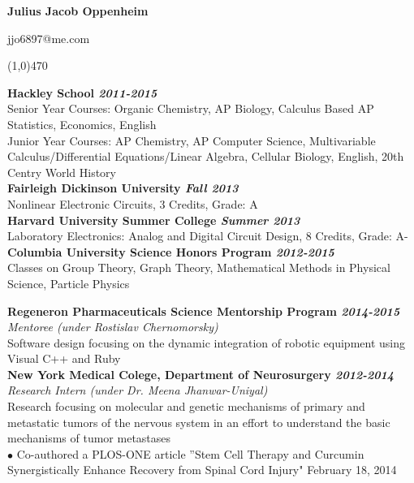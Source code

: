 \documentclass[10pt]{article}
\begin{document}
  
\centerline{\LARGE \bf Julius Jacob Oppenheim}
\centerline{jjo6897@me.com}
\noindent
\line(1,0){470}\\

\begin{adjustwidth}{2.5em}{0pt}
{\bf Hackley School \hfill \sl 2011-2015} \\
Senior Year Courses: Organic Chemistry, AP Biology, Calculus Based AP Statistics, Economics, English \\
Junior Year Courses: AP Chemistry, AP Computer Science, Multivariable Calculus/Differential Equations/Linear Algebra, Cellular Biology, English, 20th Centry World History \\
{\bf Fairleigh Dickinson University \hfill \sl Fall 2013} \\
Nonlinear Electronic Circuits, 3 Credits, Grade: A \\
 {\bf Harvard University Summer College \hfill \sl Summer 2013} \\
Laboratory Electronics: Analog and Digital Circuit Design, 8 Credits, Grade: A- \\
{\bf Columbia University Science Honors Program \hfill \sl 2012-2015} \\
Classes on Group Theory, Graph Theory, Mathematical Methods in Physical Science, Particle Physics \\
\end{adjustwidth}

\begin{adjustwidth}{2.5em}{0pt}
 {\bf Regeneron Pharmaceuticals Science Mentorship Program \hfill \sl 2014-2015} \\
{\sl Mentoree (under Rostislav Chernomorsky)} \\
Software design focusing on the dynamic integration of robotic equipment using Visual C++ and Ruby \\
{\bf New York Medical Colege, Department of Neurosurgery \hfill \sl 2012-2014} \\
{\sl Research Intern (under Dr. Meena Jhanwar-Uniyal)} \\
Research focusing on molecular and genetic mechanisms of primary and metastatic tumors of the nervous system in an effort to understand the basic mechanisms of tumor metastases \\
$\bullet$ Co-authored a PLOS-ONE article ''Stem Cell Therapy and Curcumin Synergistically Enhance Recovery from Spinal Cord Injury" \hfill February 18, 2014 \\
\end{adjustwidth}
\end{document}
